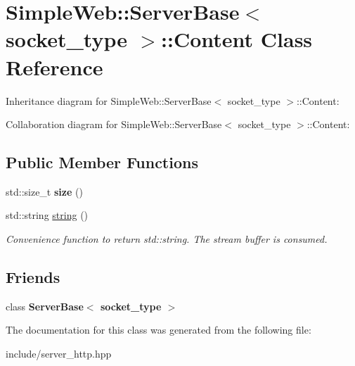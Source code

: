 \hypertarget{classSimpleWeb_1_1ServerBase_1_1Content}{}\section{Simple\+Web\+:\+:Server\+Base$<$ socket\+\_\+type $>$\+:\+:Content Class Reference}
\label{classSimpleWeb_1_1ServerBase_1_1Content}


Inheritance diagram for Simple\+Web\+:\+:Server\+Base$<$ socket\+\_\+type $>$\+:\+:Content\+:


Collaboration diagram for Simple\+Web\+:\+:Server\+Base$<$ socket\+\_\+type $>$\+:\+:Content\+:
\subsection*{Public Member Functions}
\begin{DoxyCompactItemize}
\item 
std\+::size\+\_\+t {\bfseries size} ()\hypertarget{classSimpleWeb_1_1ServerBase_1_1Content_a10c7c92313f2f3cfc74dab6a59ea1e59}{}\label{classSimpleWeb_1_1ServerBase_1_1Content_a10c7c92313f2f3cfc74dab6a59ea1e59}

\item 
std\+::string \hyperlink{classSimpleWeb_1_1ServerBase_1_1Content_a6b4a72b0631c88ef576db28f54a768cb}{string} ()\hypertarget{classSimpleWeb_1_1ServerBase_1_1Content_a6b4a72b0631c88ef576db28f54a768cb}{}\label{classSimpleWeb_1_1ServerBase_1_1Content_a6b4a72b0631c88ef576db28f54a768cb}

\begin{DoxyCompactList}\small\item\em Convenience function to return std\+::string. The stream buffer is consumed. \end{DoxyCompactList}\end{DoxyCompactItemize}
\subsection*{Friends}
\begin{DoxyCompactItemize}
\item 
class {\bfseries Server\+Base$<$ socket\+\_\+type $>$}\hypertarget{classSimpleWeb_1_1ServerBase_1_1Content_a01d54a7e16ca437c98ec571deca98dfc}{}\label{classSimpleWeb_1_1ServerBase_1_1Content_a01d54a7e16ca437c98ec571deca98dfc}

\end{DoxyCompactItemize}


The documentation for this class was generated from the following file\+:\begin{DoxyCompactItemize}
\item 
include/server\+\_\+http.\+hpp\end{DoxyCompactItemize}
